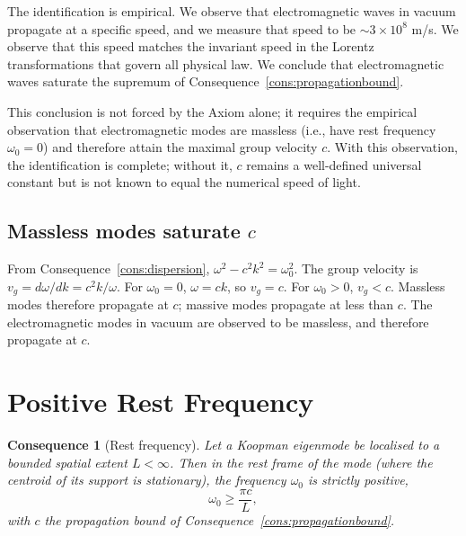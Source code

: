 \documentclass[11pt,twocolumn,a4paper]{article}
\theoremstyle{axiomstyle}
\theoremstyle{conseqstyle}
\newtheorem{consequence}{Consequence}
\theoremstyle{definition}
\theoremstyle{remark}
\begin{document}
The identification is empirical. We observe that electromagnetic waves in vacuum propagate at a specific speed, and we measure that speed to be $\sim 3\times 10^{8}$ m/s. We observe that this speed matches the invariant speed in the Lorentz transformations that govern all physical law. We conclude that electromagnetic waves saturate the supremum of Consequence~\ref{cons:propagationbound}.

This conclusion is not forced by the Axiom alone; it requires the empirical observation that electromagnetic modes are massless (i.e., have rest frequency $\omega_{0}=0$) and therefore attain the maximal group velocity $c$. With this observation, the identification is complete; without it, $c$ remains a well-defined universal constant but is not known to equal the numerical speed of light.

\subsection{Massless modes saturate $c$}

From Consequence~\ref{cons:dispersion}, $\omega^{2}-c^{2}k^{2}=\omega_{0}^{2}$. The group velocity is $v_{g}=d\omega/dk=c^{2}k/\omega$. For $\omega_{0}=0$, $\omega=ck$, so $v_{g}=c$. For $\omega_{0}>0$, $v_{g}<c$. Massless modes therefore propagate at $c$; massive modes propagate at less than $c$. The electromagnetic modes in vacuum are observed to be massless, and therefore propagate at $c$.

\section{Positive Rest Frequency}
\label{sec:restfreq}

\begin{consequence}[Rest frequency]
\label{cons:restfreq}
Let a Koopman eigenmode be localised to a bounded spatial extent $L<\infty$. Then in the rest frame of the mode (where the centroid of its support is stationary), the frequency $\omega_{0}$ is strictly positive,
\begin{equation}
\omega_{0}\ge \frac{\pi c}{L},
\label{eq:restfreqbound}
\end{equation}
with $c$ the propagation bound of Consequence~\ref{cons:propagationbound}.
\end{consequence}
\end{document}
